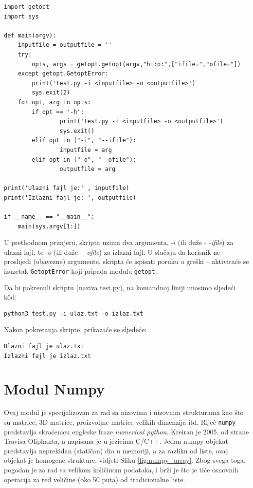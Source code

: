 \begin{verbatim}
import getopt
import sys

def main(argv):
    inputfile = outputfile = ''
    try:
        opts, args = getopt.getopt(argv,"hi:o:",["ifile=","ofile="])
    except getopt.GetoptError:
        print('test.py -i <inputfile> -o <outputfile>')
        sys.exit(2)
    for opt, arg in opts:
        if opt == '-h':
                print('test.py -i <inputfile> -o <outputfile>')
                sys.exit()
        elif opt in ("-i", "--ifile"):
                inputfile = arg
        elif opt in ("-o", "--ofile"):
                outputfile = arg

print('Ulazni fajl je:' , inputfile)
print('Izlazni fajl je: ', outputfile)

if __name__ == "__main__":
    main(sys.argv[1:])
\end{verbatim}
U prethodnom primjeru, skripta uzima dva argumenta, -$i$ (ili duže - -\emph{ifile}) za ulazni fajl, te -$o$ (ili duže - -\emph{ofile}) 
za izlazni fajl. U slučaju da korisnik ne proslijedi (obavezne) argumente, skripta će ispisati poruku o greški -- aktiviraće se izuzetak \texttt{GetoptError} koji pripada modulu \texttt{getopt}. 

 Da bi pokrenuli skriptu (naziva test.py), na komandnoj liniji unosimo sljedeći k\^od:
 \begin{verbatim}
python3 test.py -i ulaz.txt -o izlaz.txt
 \end{verbatim}
 Nakon pokretanja skripte, prikazaće se sljedeće:
\begin{verbatim}
Ulazni fajl je ulaz.txt
Izlazni fajl je izlaz.txt
 \end{verbatim}

\section{Modul Numpy}

Ovaj modul je specijalizovan za rad sa nizovima i nizovnim strukturama kao što su
matrice, 3D matrice, proizvoljne matrice velikih dimenzija itd. Riječ \texttt{numpy} predstavlja skraćenicu  engleske fraze \emph{numerical python}.  Kreiran je 2005. od strane Travisa Oliphanta, a napisana je u jezicima C/C++. Jedan numpy  objekat predstavlja neprekidan (statičan) dio u memoriji, a za razliku od liste, ovaj objekat je homogene strukture, vidjeti Sliku 	\ref{fig:numpy_array}. Zbog svega toga, pogodan je   za rad  sa velikom količinom  podataka, i brži je što je tiče osnovnih operacija za red veličine (oko 50 puta) od tradicionalne liste.\\

